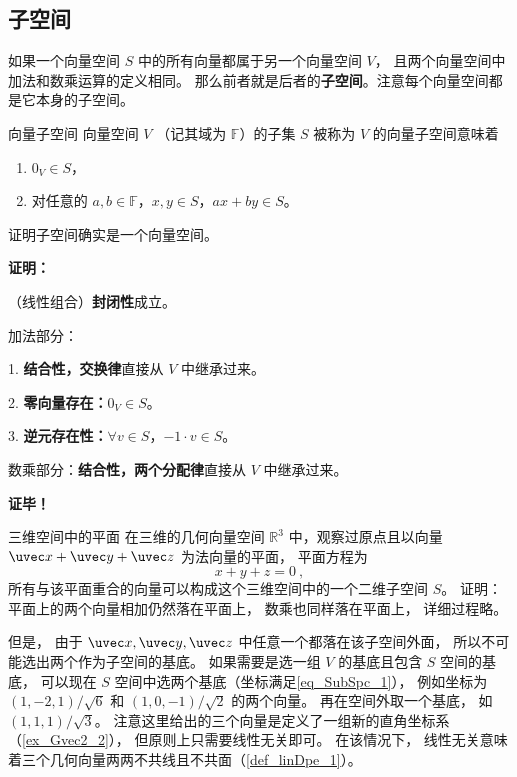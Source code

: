 
\begin{issues}
\issueDraft
\end{issues}


\subsection{子空间}

如果一个向量空间 $S$ 中的所有向量都属于另一个向量空间 $V$， 且两个向量空间中加法和数乘运算的定义相同。 那么前者就是后者的\textbf{子空间}。注意每个向量空间都是它本身的子空间。

\begin{definition}{向量子空间}
向量空间 $V$ （记其域为 $\mathbb{F}$）的子集 $S$ 被称为 $V$ 的向量子空间意味着
\begin{enumerate}
\item $0_V \in S$，
\item 对任意的 $a, b \in \mathbb{F}$，$x, y \in S$，$a x + b y \in S$。
\end{enumerate}
\end{definition}

\begin{theorem}{}
证明子空间确实是一个向量空间。
\end{theorem}
\textbf{证明：}

（线性组合）\textbf{封闭性}成立。 

加法部分：

1. \textbf{结合性，交换律}直接从 $V$ 中继承过来。

2. \textbf{零向量存在：}$0_V \in S$。

3. \textbf{逆元存在性：}$\forall v \in S$，$-1 \cdot v \in S$。

数乘部分：\textbf{结合性，两个分配律}直接从 $V$ 中继承过来。

\textbf{证毕！}

\begin{example}{三维空间中的平面}
在三维的几何向量空间 $\mathbb{R}^3$ 中，观察过原点且以向量 $\uvec x + \uvec y + \uvec z$ 为法向量的平面， 平面方程为
\begin{equation}\label{eq_SubSpc_1}
x + y + z = 0~,
\end{equation}
所有与该平面重合的向量可以构成这个三维空间中的一个二维子空间 $S$。 证明： 平面上的两个向量相加仍然落在平面上， 数乘也同样落在平面上， 详细过程略。 

但是， 由于 $\uvec x, \uvec y, \uvec z$ 中任意一个都落在该子空间外面， 所以不可能选出两个作为子空间的基底。 如果需要是选一组 $V$ 的基底且包含 $S$ 空间的基底， 可以现在 $S$ 空间中选两个基底（坐标满足\autoref{eq_SubSpc_1}）， 例如坐标为 $(1, -2, 1)/\sqrt{6}$ 和 $(1, 0, -1)/\sqrt{2}$ 的两个向量。 再在空间外取一个基底， 如 $(1, 1, 1)/\sqrt{3}$。 注意这里给出的三个向量是定义了一组新的直角坐标系（\autoref{ex_Gvec2_2}）， 但原则上只需要线性无关即可。 在该情况下， 线性无关意味着三个几何向量两两不共线且不共面（\autoref{def_linDpe_1}）。
\end{example}

